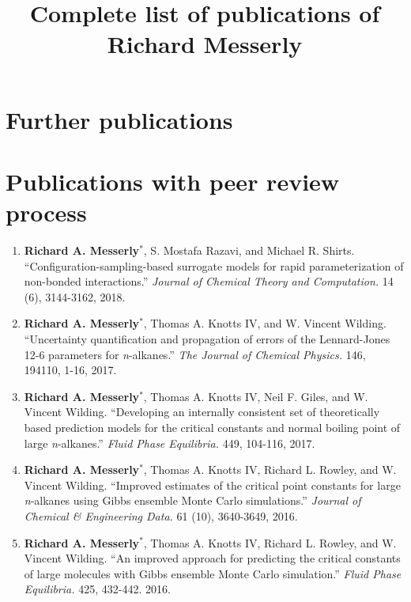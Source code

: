 \documentclass[12pt]{article}
\title{Complete list of publications of Richard Messerly}
\date{}
\begin{document}
\maketitle


\section*{Further publications}

\section{Publications with peer review process}

\begin{enumerate}
	
\item \textbf{Richard A. Messerly}$^*$, S. Mostafa Razavi, and Michael R. Shirts. ``Configuration-sampling-based surrogate models for rapid parameterization of non-bonded interactions.'' \textit{Journal of Chemical Theory and Computation.} 14 (6), 3144-3162, 2018.
	
\item \textbf{Richard A. Messerly}$^*$, Thomas A. Knotts IV, and W. Vincent Wilding. ``Uncertainty quantification and propagation of errors of the Lennard-Jones 12-6 parameters for \textit{n}-alkanes.'' \textit{The Journal of Chemical Physics.} 146, 194110, 1-16, 2017.

\item \textbf{Richard A. Messerly}$^*$, Thomas A. Knotts IV, Neil F. Giles, and W. Vincent Wilding. ``Developing an internally consistent set of theoretically based prediction models for the critical constants and normal boiling point of large \textit{n}-alkanes.'' \textit{Fluid Phase Equilibria.} 449, 104-116, 2017.

\item \textbf{Richard A. Messerly}$^*$, Thomas A. Knotts IV, Richard L. Rowley, and W. Vincent Wilding. ``Improved estimates of the critical point constants for large \textit{n}-alkanes using Gibbs ensemble Monte Carlo simulations.'' \textit{Journal of Chemical \& Engineering Data.} 61 (10), 3640-3649, 2016.

\item \textbf{Richard A. Messerly}$^*$, Thomas A. Knotts IV, Richard L. Rowley, and W. Vincent Wilding. ``An improved approach for predicting the critical constants of large molecules with Gibbs ensemble Monte Carlo simulation.'' \textit{Fluid Phase Equilibria.} 425, 432-442. 2016.


\end{enumerate}
\end{document}
